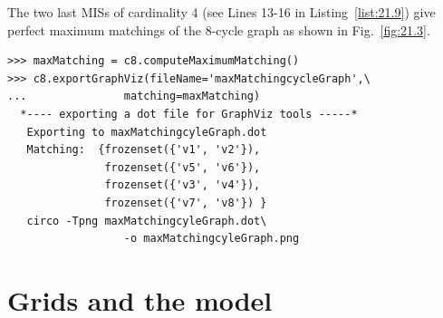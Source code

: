 The two last MISs of cardinality 4 (see Lines 13-16 in Listing~\vref{list:21.9}) give perfect maximum matchings of the 8-cycle graph as shown in Fig.~\vref{fig:21.3}. 
\begin{lstlisting}[caption={Computing maximum matchings in the 8-cycle graph},label=list:21.10]
>>> maxMatching = c8.computeMaximumMatching()
>>> c8.exportGraphViz(fileName='maxMatchingcycleGraph',\
...   		      matching=maxMatching)
  *---- exporting a dot file for GraphViz tools -----*
   Exporting to maxMatchingcyleGraph.dot
   Matching:  {frozenset({'v1', 'v2'}),
               frozenset({'v5', 'v6'}),
               frozenset({'v3', 'v4'}),
               frozenset({'v7', 'v8'}) }
   circo -Tpng maxMatchingcyleGraph.dot\
                  -o maxMatchingcyleGraph.png
\end{lstlisting}
	    
\section{Grids and the \Ising model}
\label{sec:21.5}

